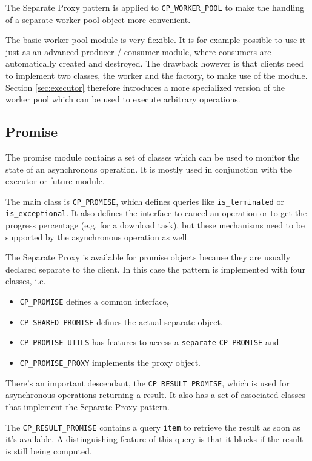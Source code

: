 The Separate Proxy pattern  is applied to \lstinline!CP_WORKER_POOL! to make the handling of a separate worker pool object more convenient.

The basic worker pool module is very flexible.
It is for example possible to use it just as an advanced producer / consumer module, where consumers are automatically created and destroyed.
The drawback however is that clients need to implement two classes, the worker and the factory, to make use of the module.
Section \ref{sec:executor} therefore introduces a more specialized version of the worker pool which can be used to execute arbitrary operations.

\subsection{Promise}
\label {sec:promise}

The promise module contains a set of classes which can be used to monitor the state of an asynchronous operation.
It is mostly used in conjunction with the executor or future module.

The main class is \lstinline!CP_PROMISE!, which defines queries like \lstinline!is_terminated! or \lstinline!is_exceptional!.
It also defines the interface to cancel an operation or to get the progress percentage (e.g. for a download task), but these mechanisms need to be supported by the asynchronous operation as well.

The Separate Proxy  is available for promise objects because they are usually declared separate to the client.
In this case the pattern is implemented with four classes, i.e.
\begin{itemize}
 \item \lstinline!CP_PROMISE! defines a common interface,
 \item \lstinline!CP_SHARED_PROMISE! defines the actual separate object,
 \item \lstinline!CP_PROMISE_UTILS! has features to access a \lstinline!separate! \lstinline!CP_PROMISE! and
 \item \lstinline!CP_PROMISE_PROXY! implements the proxy object.
\end{itemize}

There's an important descendant, the \lstinline!CP_RESULT_PROMISE!, which is used for asynchronous operations returning a result.
It also has a set of associated classes that implement the Separate Proxy pattern.

The \lstinline!CP_RESULT_PROMISE! contains a query \lstinline!item! to retrieve the result as soon as it's available.
A distinguishing feature of this query is that it blocks if the result is still being computed.

